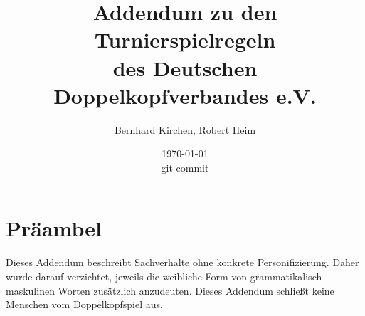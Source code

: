 \documentclass[12pt]{article}
\newcommand{\gitref}{}
\begin{document}
\title{Addendum zu den Turnierspielregeln\\des Deutschen Doppelkopfverbandes e.V.}
\author{Bernhard Kirchen, Robert Heim}
\date{\today\\git commit \gitref}

\maketitle

\section*{Präambel}
Dieses Addendum beschreibt Sachverhalte ohne konkrete Personifizierung. Daher wurde
darauf verzichtet, jeweils die weibliche Form von grammatikalisch maskulinen Worten
zusätzlich anzudeuten. Dieses Addendum schließt keine Menschen vom Doppelkopfspiel
aus.


\end{document}
